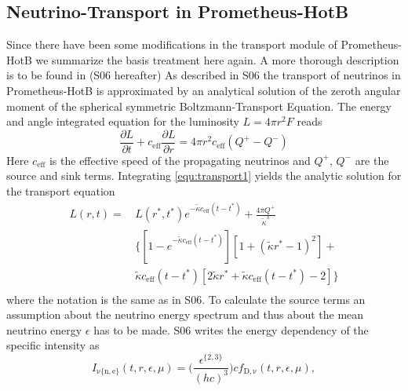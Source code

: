 \documentclass[fleqn,usenatbib]{mnras}
\begin{document}
\newpage
\begin{appendices}

 \section{Neutrino-Transport in Prometheus-HotB}
  \label{Appendix:Neutrino}
   Since there have been some modifications in the transport module of Prometheus-HotB we summarize the basis treatment here again. A more thorough description is to be found in \cite{Scheck2006} (S06 hereafter)
  As described in S06 the transport of neutrinos in Prometheus-HotB is approximated by an analytical solution of the zeroth angular moment of the spherical symmetric Boltzmann-Transport Equation. The energy and angle integrated equation for the luminosity $L=4\pi r^2 F$ reads
 \begin{equation}
  \label{equ:transport1}
  \frac{\partial L}{\partial t} + c_{\mathrm{eff}} \frac{\partial L }{\partial r} = 4 \pi r^2 c_{\mathrm{eff}} (Q^+ - Q^-)
 \end{equation}
 Here $c_{\mathrm{eff}}$ is the effective speed of the propagating neutrinos and $Q^+$, $Q^-$ are the source and sink terms.
 Integrating \ref{equ:transport1} yields the analytic solution for the transport equation
 \begin{equation}
  \begin{split}
    L(r,t) = \, & L(r^*,t^{*}) e^{- \tilde{\kappa} c_{\mathrm{eff}} (t-t^{*}) } + \frac{4\pi Q^{+}}{\tilde{\kappa}^3}\\
    & \Big\{ [ 1 - e^{-\tilde{\kappa} c_{\mathrm{eff}} (t-t^{*} )} ] [ 1 + (\tilde{\kappa}r^{*} -1)^2 ] + \\
    & \tilde{\kappa} c_{\mathrm{eff}} (t - t^{*} ) [ 2 \tilde{\kappa} r^{*} + \tilde{\kappa} c_{\mathrm{eff}} (t-t^{*}) - 2 ] \Big\}\\
 \end{split}
 \end{equation}
 where the notation is the same as in S06.
 To calculate the source terms an assumption about the neutrino energy spectrum and thus about the mean neutrino energy $\epsilon$ has to be made. S06 writes the energy dependency of the specific intensity as
  \begin{equation}
  \label{equ:intensity}
  I_{\mathrm{\nu\{n,e\}}}(t,r,\epsilon,\mu) = \Big(\frac{\epsilon^{\{2,3\}}}{(hc)^3} \Big) c f_{\mathrm{D,\nu}}(t, r, \epsilon, \mu),
 \end{equation}

\end{appendices}
\end{document}
